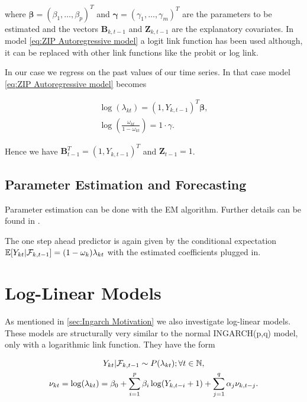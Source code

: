 where $\bm{\beta} = (\beta_1,\ldots,\beta_p)^T$ and $\bm{\gamma}=(\gamma_1,\ldots,\gamma_m)^T$ are the parameters to be estimated and the vectors $\bm{B}_{k,t-1}$ and $\bm{Z}_{k,t-1}$ are the explanatory covariates. In model \ref{eq:ZIP Autoregressive model} a logit link function has been used although, it can be replaced with other link functions like the probit or log link. 

In our case we regress on the past values of our time series. In that case model \ref{eq:ZIP Autoregressive model} becomes

\begin{gather}
\log(\lambda_{kt}) = (1,Y_{k,t-1})^T \bm{\beta},\\
\log\left(\frac{\omega_{kt}}{1-\omega_{kt}}\right)= 1 \cdot \gamma.
\label{eq:ZIP Autoregressive model timeseries}
\end{gather}

Hence we have $\bm{B}^T_{t-1} = (1,Y_{k,t-1})^T$ and $\bm{Z}_{t-1} = 1$. 

\subsection{Parameter Estimation and Forecasting}
\label{sec: ZIM Parameter Estimation and Forecasting}

Parameter estimation can be done with the EM algorithm. Further details can be found in \cite{Lambert:1992}.

The one step ahead predictor is again given by the conditional expectation $\mathbb{E}[Y_{kt} | \mathcal{F}_{k,t-1}] = (1-\omega_k)\lambda_{kt} $ with the estimated coefficients plugged in. 

\section{Log-Linear Models}
\label{sec: Log-Linear Models}

As mentioned in \ref{sec:Ingarch Motivation} we also investigate log-linear models. These models are structurally very similar to the normal INGARCH(p,q) model, only with a logarithmic link function. They have the form 

\begin{gather}
Y_{kt} | \mathcal{F}_{k,t-1} \sim P(\lambda_{kt}); \forall t \in \mathbb{N}, \\
\nu_{kt}= \log(\lambda_{kt}) = \beta_0 + \sum_{i=1}^p\beta_i \log(Y_{k,t-i}+1) + \sum_{j=1}^q\alpha_j \nu_{k,t-j}.
\label{eq:Log-Linear model}
\end{gather}

